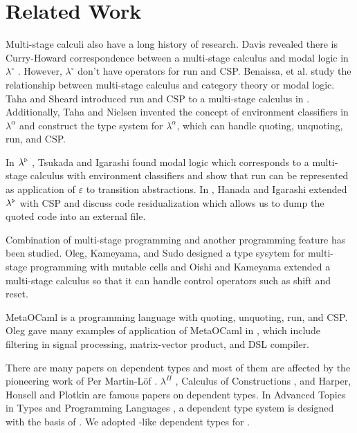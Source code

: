 
\section{Related Work \label{sec:related-work}}


Multi-stage calculi also have a long history of research.
Davis revealed there is Curry-Howard correspondence between a multi-stage calculus and modal logic in $\lambda^\circ$ \cite{davies1996temporal}.
However, $\lambda^\circ$ don't have operators for run and CSP.
Benaissa, et al. \cite{benaissa1999logical} study the relationship between multi-stage calculus and category theory or modal logic.
Taha and Sheard introduced run and CSP to a multi-stage calculus in \cite{MetaML}.
Additionally, Taha and Nielsen invented the concept of environment classifiers in $\lambda^\alpha$ \cite{taha2003environment} and 
construct the type system for $\lambda^\alpha$, which can handle quoting, unquoting, run, and CSP.

In $\lambda^{\mathop{\triangleright}}$ \cite{Tsukada}, Tsukada and Igarashi found modal logic which corresponds to a multi-stage calculus with environment classifiers and
show that run can be represented as application of $\varepsilon$ to transition abstractions.
In \LTP \cite{Hanada2014}, Hanada and Igarashi extended $\lambda^{\mathop{\triangleright}}$ with CSP and discuss code residualization 
which allows us to dump the quoted code into an external file.


Combination of multi-stage programming and another programming feature has been studied.
Oleg, Kameyama, and Sudo\cite{kiselyov2016refined} designed a type sysytem for multi-stage programming with mutable cells and
Oishi and Kameyama\cite{oishi2017staging} extended a multi-stage calculus so that it can handle control operators such as shift and reset.


MetaOCaml is a programming language with quoting, unquoting, run, and CSP.
Oleg gave many examples of application of MetaOCaml in \cite{8384206}, 
which include filtering in signal processing, matrix-vector product, and DSL compiler.


There are many papers on dependent types and most of them are affected by the pioneering work of Per Martin-L\"{o}f \cite{martin1973intuitionstic}.
$\lambda^\Pi$ \cite{Meyer1986}, Calculus of Constructions \cite{coquand:inria-00076024}, 
and Harper, Honsell and Plotkin \cite{harper1993framework} are famous papers on dependent types.
In Advanced Topics in Types and Programming Languages \cite{attapl},
a dependent type system \LLF is designed with the basis of \cite{harper1993framework}.
We adopted \cite{attapl}-like dependent types for \LMD.

